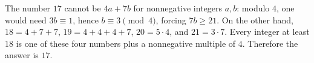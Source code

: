 The number $17$ cannot be $4a+7b$ for nonnegative integers $a,b$: modulo $4$, one would need $3b\equiv1$, hence $b\equiv3\pmod4$, forcing $7b\ge21$. On the other hand, $18=4+7+7$, $19=4+4+4+7$, $20=5\cdot4$, and $21=3\cdot7$. Every integer at least $18$ is one of these four numbers plus a nonnegative multiple of $4$. Therefore the answer is $\boxed{17}$.
